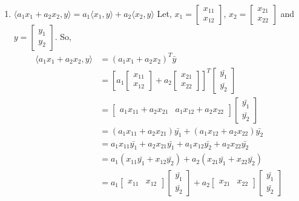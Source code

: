 \documentclass[a4paper]{article}
\begin{document}
\begin{qalist}
\begin{enumerate}[label=\alph*., align=left]
			\item $\langle {a}_{1}{x}_{1} + {a}_{2}{x}_{2},y \rangle = {a}_{1}\langle {x}_{1}, y \rangle + {a}_{2}\langle {x}_{2}, y \rangle$
				Let, ${x}_{1} = \begin{bmatrix}{x}_{11} \\ {x}_{12}\end{bmatrix}$, ${x}_{2} = \begin{bmatrix}{x}_{21} \\ {x}_{22}\end{bmatrix}$ and  $y = \begin{bmatrix}{y}_{1} \\ {y}_{2}\end{bmatrix}$. So, 
				\begin{align}
					\langle {a}_{1}{x}_{1} + {a}_{2}{x}_{2},y \rangle &= {({a}_{1}{x}_{1} + {a}_{2}{x}_{2})}^{T}\bar{y} \\
					&= {\left[{a}_{1}\begin{bmatrix}{x}_{11} \\ {x}_{12}\end{bmatrix} +  {a}_{2}\begin{bmatrix}{x}_{21} \\ {x}_{22}\end{bmatrix}\right]}^{T}\begin{bmatrix}\bar{{y}_{1}} \\ \bar{{y}_{2}}\end{bmatrix} \\
					&= \begin{bmatrix}{a}_{1}{x}_{11}+{a}_{2}{x}_{21} & {a}_{1}{x}_{12}+{a}_{2}{x}_{22}\end{bmatrix} \begin{bmatrix}\bar{{y}_{1}} \\ \bar{{y}_{2}}\end{bmatrix} \\
					&= ({a}_{1}{x}_{11}+{a}_{2}{x}_{21})\bar{{y}_{1}} +  ({a}_{1}{x}_{12}+{a}_{2}{x}_{22})\bar{{y}_{2}} \\
					&= {a}_{1}{x}_{11}\bar{{y}_{1}} + {a}_{2}{x}_{21}\bar{{y}_{1}} + {a}_{1}{x}_{12}\bar{{y}_{2}} + {a}_{2}{x}_{22}\bar{{y}_{2}}\\
					&= {a}_{1}({x}_{11}\bar{{y}_{1}} + {x}_{12}\bar{{y}_{2}}) + {a}_{2}({x}_{21}\bar{{y}_{1}} + {x}_{22}\bar{{y}_{2}}) \\
					&= {a}_{1}\begin{bmatrix}{x}_{11} & {x}_{12}\end{bmatrix}\begin{bmatrix}\bar{{y}_{1}} \\ \bar{{y}_{2}}\end{bmatrix} + {a}_{2}\begin{bmatrix}{x}_{21} & {x}_{22}\end{bmatrix} \begin{bmatrix}\bar{{y}_{1}} \\ \bar{{y}_{2}}\end{bmatrix} \\

\end{align}
\end{enumerate}
\end{qalist}
\end{document}

